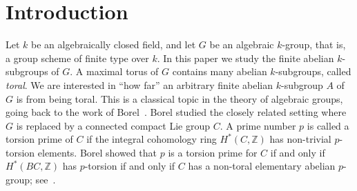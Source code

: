 \documentclass[12pt]{amsart}
\numberwithin{equation}{section}
\theoremstyle{remark}
\begin{document}
\begin{abstract}  Let $k$ be an algebraically closed field, and let $G$ be an algebraic $k$-group. We study finite abelian $k$-subgroups $A \subset G$ whose order is not divisible by the characteristic of $k$. This is a classical topic in the theory of algebraic groups going back to the work of Borel in the early 1960s. 
We sharpen previously known results on the structure of $A$. 
In particular, we show that there exists a maximal torus $T$ of $G$ such that the index $[A: (A \cap T)]$ divides the Grothendieck torsion index $t(G)$. We also show that there exists a maximal torus $T$ such that the quotient group $A/(A \cap T)$ is ``small'' in a suitable sense. As applications of these results, we (i) give a positive answer to a question of Totaro for $G$-torsors over 
fields $k_r = k(\!(t_1)\!)(\!(t_2)\!) \ldots (\!(t_r)\!)$ of iterated Laurent series, (ii) prove a variant of the ``hypoth\`ese optimiste'' of Tits about splitting fields of $E_8$-torsors, and (iii) show that certain torsors over $k_r$ cannot be split by the function field of a genus $1$ curve.
\end{abstract}
 
\maketitle
\tableofcontents

\section{Introduction} 

Let $k$ be an algebraically closed field, and let $G$ be an algebraic $k$-group, that is, a group scheme of finite type over $k$. In this paper we study the finite abelian $k$-subgroups of $G$. A maximal torus of $G$ contains many abelian $k$-subgroups, called \emph{toral}. 
We are interested in ``how far'' an arbitrary finite abelian $k$-subgroup $A$ of $G$ is from being toral. This is a classical topic in the theory of algebraic groups, going back to the work of Borel~\cite{borel-tohoku}. Borel studied the closely related setting where $G$ is replaced by a connected compact Lie group $C$. A prime number $p$ is called a torsion prime of $C$ if the integral cohomology ring $H^*(C, \mathbb Z)$ has non-trivial $p$-torsion elements. Borel showed that $p$ is a torsion prime for $C$ if and only if $H^*(BC, \mathbb Z)$ has $p$-torsion if and only if $C$ has a non-toral elementary abelian $p$-group; see~\cite[Theorem 4.5]{borel-tohoku}. 
\end{document}
